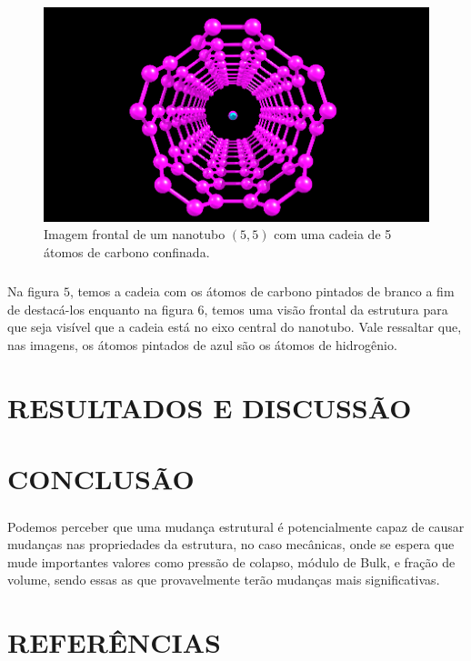 \documentclass[12pt,a4paper]{report}
\begin{document}
\begin{figure} [!h]
\centering
\includegraphics[scale=0.5]{cntc2.png}
\caption{Imagem frontal de um nanotubo $(5,5)$ com uma cadeia de 5 átomos de carbono confinada.}
\end{figure}

\paragraph{}
Na figura $5$, temos a cadeia com os átomos de carbono pintados de branco a fim de destacá-los enquanto na figura $6$, temos uma visão frontal da estrutura para que seja visível que a cadeia está no eixo central do nanotubo. Vale ressaltar que, nas imagens, os átomos pintados de azul são os átomos de hidrogênio.


\chapter*{RESULTADOS E DISCUSSÃO}

\chapter*{CONCLUSÃO}
\paragraph{}
Podemos perceber que uma mudança estrutural é potencialmente capaz de causar mudanças nas propriedades da estrutura, no caso mecânicas, onde se espera que mude importantes valores como pressão de colapso, módulo de Bulk, e fração de volume, sendo essas as que provavelmente terão mudanças mais significativas.


\chapter*{REFERÊNCIAS}
\end{document}
